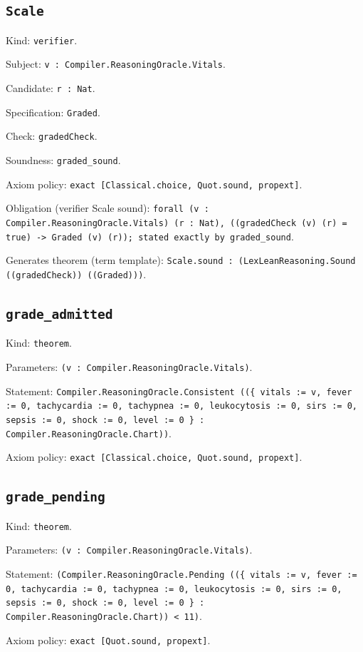 \documentclass[11pt]{article}
\begin{document}
\subsection*{\texttt{Scale}}
\noindent Kind: \texttt{verifier}.\par
\noindent Subject: \texttt{v : Compiler.ReasoningOracle.Vitals}.\par
\noindent Candidate: \texttt{r : Nat}.\par
\noindent Specification: \texttt{Graded}.\par
\noindent Check: \texttt{gradedCheck}.\par
\noindent Soundness: \texttt{graded\_sound}.\par
\noindent Axiom policy: \texttt{exact [Classical.choice, Quot.sound, propext]}.\par
\noindent Obligation (verifier Scale sound): \texttt{forall (v : Compiler.ReasoningOracle.Vitals) (r : Nat), ((gradedCheck (v) (r) = true) -> Graded (v) (r)); stated exactly by graded\_sound}.\par
\noindent Generates theorem (term template): \texttt{Scale.sound : (LexLeanReasoning.Sound ((gradedCheck)) ((Graded)))}.\par
\subsection*{\texttt{grade\_admitted}}
\noindent Kind: \texttt{theorem}.\par
\noindent Parameters: \texttt{(v : Compiler.ReasoningOracle.Vitals)}.\par
\noindent Statement: \texttt{Compiler.ReasoningOracle.Consistent ((\{ vitals := v, fever := 0, tachycardia := 0, tachypnea := 0, leukocytosis := 0, sirs := 0, sepsis := 0, shock := 0, level := 0 \} : Compiler.ReasoningOracle.Chart))}.\par
\noindent Axiom policy: \texttt{exact [Classical.choice, Quot.sound, propext]}.\par
\subsection*{\texttt{grade\_pending}}
\noindent Kind: \texttt{theorem}.\par
\noindent Parameters: \texttt{(v : Compiler.ReasoningOracle.Vitals)}.\par
\noindent Statement: \texttt{(Compiler.ReasoningOracle.Pending ((\{ vitals := v, fever := 0, tachycardia := 0, tachypnea := 0, leukocytosis := 0, sirs := 0, sepsis := 0, shock := 0, level := 0 \} : Compiler.ReasoningOracle.Chart)) < 11)}.\par
\noindent Axiom policy: \texttt{exact [Quot.sound, propext]}.\par
\end{document}
